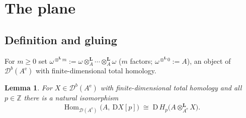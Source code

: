 \documentclass[11pt]{amsart}
\newtheorem{lemma}[theorem]{Lemma}
\theoremstyle{definition}
\newcommand{\D}{\mathrm{D}}
\newcommand{\Hom}{\operatorname{Hom}}
\newcommand{\Ae}{A^{\mathrm{e}}}
\newcommand{\der}{\mathcal{D}}
\newcommand{\Lotimes}{\otimes^{\mathbf{L}}}
\begin{document}
\section{The plane}\label{sec:plane}

\subsection{Definition and gluing}

For $m\ge0$ set $\omega^{\Lotimes m}:=\omega\Lotimes_A\cdots\Lotimes_A\omega$
($m$ factors; $\omega^{\Lotimes0}:=A$), an object of $\der^b(\Ae)$ with
finite-dimensional total homology.

\begin{lemma}\label{lem:dual}
For $X\in\der^b(\Ae)$ with finite-dimensional total homology and all
$p\in\mathbb Z$ there is a natural isomorphism
\[
\Hom_{\der(\Ae)}\bigl(A,\ \D X[p]\bigr)\;\cong\;
\D\,H_p\bigl(A\Lotimes_{\Ae}X\bigr).
\]
\end{lemma}
\end{document}
